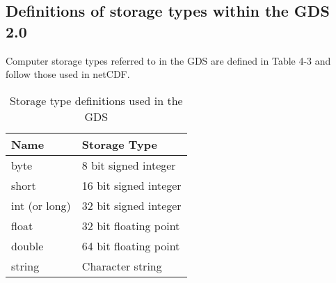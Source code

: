 \subsection{Definitions of storage types within the GDS 2.0}
Computer storage types referred to in the GDS are defined in Table 4-3 and follow those used in
netCDF.

\begin{table}[h]
\centering
\caption{Storage type definitions used in the GDS}
\label{tab:storage-definitions}
\begin{tabular}{|l|l|}
\hline
\rowcolor{lightgray} \textbf{Name} & \textbf{Storage Type}\\
\hline
byte & 8 bit signed integer\\
\hline
short & 16 bit signed integer\\
\hline
int (or long) & 32 bit signed integer\\
\hline
float & 32 bit floating point\\
\hline
double & 64 bit floating point\\
\hline
string & Character string\\
\hline
\end{tabular}
\end{table}
